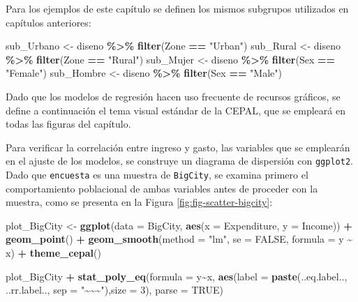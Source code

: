 \documentclass[
  spanish,
  12pt,
]{book}
\newenvironment{Shaded}{\begin{snugshade}}{\end{snugshade}}
\newcommand{\AttributeTok}[1]{\textcolor[rgb]{0.13,0.29,0.53}{#1}}
\newcommand{\ConstantTok}[1]{\textcolor[rgb]{0.56,0.35,0.01}{#1}}
\newcommand{\DecValTok}[1]{\textcolor[rgb]{0.00,0.00,0.81}{#1}}
\newcommand{\FunctionTok}[1]{\textcolor[rgb]{0.13,0.29,0.53}{\textbf{#1}}}
\newcommand{\NormalTok}[1]{#1}
\newcommand{\OtherTok}[1]{\textcolor[rgb]{0.56,0.35,0.01}{#1}}
\newcommand{\SpecialCharTok}[1]{\textcolor[rgb]{0.81,0.36,0.00}{\textbf{#1}}}
\newcommand{\StringTok}[1]{\textcolor[rgb]{0.31,0.60,0.02}{#1}}
\begin{document}
Para los ejemplos de este capítulo se definen los mismos subgrupos utilizados en capítulos anteriores:

\begin{Shaded}
\begin{Highlighting}[]
\NormalTok{sub\_Urbano }\OtherTok{\textless{}{-}}\NormalTok{ diseno }\SpecialCharTok{\%\textgreater{}\%}  \FunctionTok{filter}\NormalTok{(Zone }\SpecialCharTok{==} \StringTok{"Urban"}\NormalTok{)}
\NormalTok{sub\_Rural  }\OtherTok{\textless{}{-}}\NormalTok{ diseno }\SpecialCharTok{\%\textgreater{}\%}  \FunctionTok{filter}\NormalTok{(Zone }\SpecialCharTok{==} \StringTok{"Rural"}\NormalTok{)}
\NormalTok{sub\_Mujer  }\OtherTok{\textless{}{-}}\NormalTok{ diseno }\SpecialCharTok{\%\textgreater{}\%}  \FunctionTok{filter}\NormalTok{(Sex }\SpecialCharTok{==} \StringTok{"Female"}\NormalTok{)}
\NormalTok{sub\_Hombre }\OtherTok{\textless{}{-}}\NormalTok{ diseno }\SpecialCharTok{\%\textgreater{}\%}  \FunctionTok{filter}\NormalTok{(Sex }\SpecialCharTok{==} \StringTok{"Male"}\NormalTok{)}
\end{Highlighting}
\end{Shaded}

Dado que los modelos de regresión hacen uso frecuente de recursos gráficos, se define a continuación el tema visual estándar de la CEPAL, que se empleará en todas las figuras del capítulo.

Para verificar la correlación entre ingreso y gasto, las variables que se emplearán en el ajuste de los modelos, se construye un diagrama de dispersión con \texttt{ggplot2}. Dado que \texttt{encuesta} es una muestra de \texttt{BigCity}, se examina primero el comportamiento poblacional de ambas variables antes de proceder con la muestra, como se presenta en la Figura \ref{fig:fig-scatter-bigcity}:

\begin{Shaded}
\begin{Highlighting}[]
\NormalTok{plot\_BigCity }\OtherTok{\textless{}{-}} \FunctionTok{ggplot}\NormalTok{(}\AttributeTok{data =}\NormalTok{ BigCity,}
                       \FunctionTok{aes}\NormalTok{(}\AttributeTok{x =}\NormalTok{ Expenditure, }\AttributeTok{y =}\NormalTok{ Income)) }\SpecialCharTok{+}
                       \FunctionTok{geom\_point}\NormalTok{() }\SpecialCharTok{+} \FunctionTok{geom\_smooth}\NormalTok{(}\AttributeTok{method =} \StringTok{"lm"}\NormalTok{,}
                       \AttributeTok{se =} \ConstantTok{FALSE}\NormalTok{,}
                       \AttributeTok{formula =}\NormalTok{ y }\SpecialCharTok{\textasciitilde{}}\NormalTok{ x) }\SpecialCharTok{+} \FunctionTok{theme\_cepal}\NormalTok{()}

\NormalTok{plot\_BigCity }\SpecialCharTok{+} \FunctionTok{stat\_poly\_eq}\NormalTok{(}\AttributeTok{formula =}\NormalTok{ y}\SpecialCharTok{\textasciitilde{}}\NormalTok{x, }\FunctionTok{aes}\NormalTok{(}\AttributeTok{label =} \FunctionTok{paste}\NormalTok{(..eq.label..,}
\NormalTok{   ..rr.label.., }\AttributeTok{sep =} \StringTok{"\textasciitilde{}\textasciitilde{}\textasciitilde{}"}\NormalTok{),}\AttributeTok{size =} \DecValTok{3}\NormalTok{), }\AttributeTok{parse =} \ConstantTok{TRUE}\NormalTok{)}
\end{Highlighting}
\end{Shaded}
\end{document}
